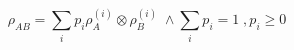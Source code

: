\begin{equation}\label{eqn:rho_sep}
\rho_{AB} = \sum_i p_i \rho_A^{(i)} \otimes \rho_B ^{(i)} \; \wedge    \sum_i p_i =1 \; , p_i \geq 0
\end{equation}
